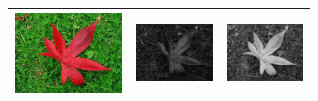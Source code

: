 \documentclass[a4paper, 12pt]{article}
\begin{document}
\begin{table}[!htb]
\begin{tabular}{|c|p{0.3\linewidth}|p{0.3\linewidth}|}
        \hline
        \includegraphics[scale=0.4]{part2/testdata/1.png} & \includegraphics[scale=0.4]{part2/result/1_RGB_0.0_0.0_1.0_gray.png} & \includegraphics[scale=0.4]{part2/result/1_RGB_0.8_0.2_0.0_gray.png} \\
        \hline
    \end{tabular}
\end{table}
\end{document}
